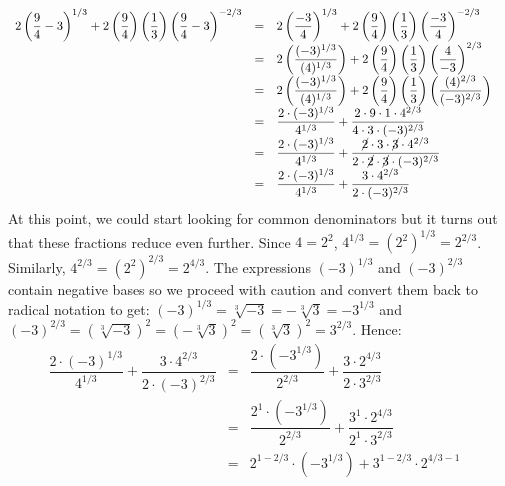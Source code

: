 \documentclass{ximera}
\begin{document}
\begin{example}
\begin{enumerate}
\[\begin{array}{rclr}
2 \left(\dfrac{9}{4} - 3\right)^{1/3} + 2\left(\dfrac{9}{4}\right)\left(\dfrac{1}{3}\right)\left(\dfrac{9}{4}-3\right)^{-2/3} & = &2 \left(\dfrac{-3}{4} \right)^{1/3} + 2\left(\dfrac{9}{4}\right)\left(\dfrac{1}{3}\right)\left(\dfrac{-3}{4}\right)^{-2/3} & \\ [5pt]

& = & 2 \left(\dfrac{(-3)^{1/3}}{(4)^{1/3}} \right) + 2\left(\dfrac{9}{4}\right)\left(\dfrac{1}{3}\right)\left(\dfrac{4}{-3}\right)^{2/3} & \\ [5pt]

& = & 2 \left(\dfrac{(-3)^{1/3}}{(4)^{1/3}} \right) + 2\left(\dfrac{9}{4}\right)\left(\dfrac{1}{3}\right)\left(\dfrac{(4)^{2/3}}{(-3)^{2/3}}\right) & \\ [5pt]

& = & \dfrac{2 \cdot (-3)^{1/3}}{4^{1/3}} + \dfrac{2 \cdot 9 \cdot 1 \cdot 4^{2/3}}{4 \cdot 3 \cdot (-3)^{2/3}} & \\ [5pt]

& = & \dfrac{2 \cdot (-3)^{1/3}}{4^{1/3}} + \dfrac{\cancel{2} \cdot 3 \cdot \cancel{3} \cdot 4^{2/3}}{2 \cdot \cancel{2} \cdot \cancel{3} \cdot (-3)^{2/3}} & \\ [5pt]

& = & \dfrac{2 \cdot (-3)^{1/3}}{4^{1/3}} + \dfrac{3 \cdot 4^{2/3}}{2 \cdot (-3)^{2/3}} & \\ \end{array} \] At this point, we could start looking for common denominators but it turns out that these fractions reduce even further.  Since $4 = 2^2$, $4^{1/3} = (2^2)^{1/3} = 2^{2/3}$.  Similarly, $4^{2/3} = (2^2)^{2/3} = 2^{4/3}$. The expressions $(-3)^{1/3}$ and $(-3)^{2/3}$ contain negative bases so we proceed with caution and convert them back to radical notation to get:  $(-3)^{1/3} = \sqrt[3]{-3} = -\sqrt[3]{3} = - 3^{1/3}$ and  $(-3)^{2/3} = (\sqrt[3]{-3})^2 = (-\sqrt[3]{3})^2 =(\sqrt[3]{3})^2 = 3^{2/3}$.  Hence:\[ \begin{array}{rclr}

\dfrac{2 \cdot (-3)^{1/3}}{4^{1/3}} + \dfrac{3 \cdot 4^{2/3}}{2 \cdot (-3)^{2/3}} & = & \dfrac{2 \cdot (-3^{1/3})}{2^{2/3}} + \dfrac{3 \cdot 2^{4/3}}{2 \cdot 3^{2/3}}  & \\ [3pt]

& = & \dfrac{2^{1} \cdot (-3^{1/3})}{2^{2/3}} + \dfrac{3^{1} \cdot 2^{4/3}}{2^{1} \cdot 3^{2/3}}  & \\ [3pt]

& = & 2^{1 - 2/3} \cdot (-3^{1/3}) +3^{1- 2/3} \cdot 2^{4/3 - 1}  & \\ [3pt]


\end{array}\]
\end{enumerate}
\end{example}
\end{document}
